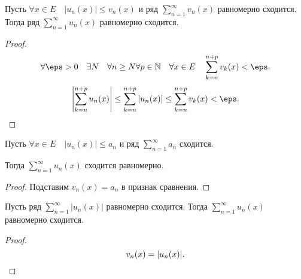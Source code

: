 \begin{theorem} \thmslashn

    Пусть $\forall{x\in E}\quad |u_{n}(x)| \le v_{n}(x)$ и ряд $\sum\limits_{n=1}^{\infty} v_{n}(x)$ равномерно сходится. Тогда ряд $\sum\limits_{n=1}^{\infty} u_{n}(x)$ равномерно сходится.
    \begin{proof} \thmslashn
    
        \[ \forall{\eps > 0}\quad \exists{N}\quad \forall{n \ge N} \forall{p\in \mathbb{N}}\quad \forall{x\in E}\quad \sum\limits_{k=n}^{n+p} v_{k}(x) < \eps  .\]
        \[ \left| \sum\limits_{k=n}^{n+p} u_{n}(x)\right| \le \sum\limits_{k=n}^{n+p} |u_{n}(x)| \le \sum\limits_{k=n}^{n+p} v_{k}(x) < \eps.\qedhere\] 
    \end{proof}
\end{theorem}
\begin{theorem} \thmslashn

    Пусть $\forall{x\in E}\quad |u_{n}(x)| \le a_{n}$ и ряд $\sum\limits_{n=1}^{\infty} a_{n}$ сходится.

    Тогда $\sum\limits_{n=1}^{\infty} u_{n}(x)$ сходится равномерно.
    \begin{proof} \thmslashn
    
        Подставим $v_{n}(x) = a_{n}$ в признак сравнения.
    \end{proof}
\end{theorem}
\begin{consequence} \thmslashn

    Пусть ряд $\sum\limits_{n=1}^{\infty} |u_{n}(x)|$ равномерно сходится. Тогда $\sum\limits_{n=1}^{\infty} u_{n}(x)$ равномерно сходится.
    \begin{proof} \thmslashn
    
        \[v_{n}(x) = |u_{n}(x)|.\qedhere\]
    \end{proof}
\end{consequence}
